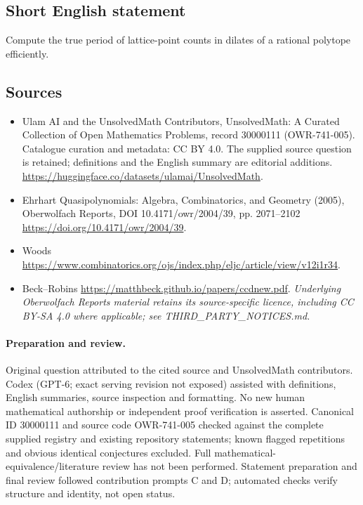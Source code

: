 \documentclass[11pt]{article}
\begin{document}
\subsection{Short English statement}
Compute the true period of lattice-point counts in dilates of a rational polytope efficiently.
\subsection{Sources}
\begin{itemize}
\item[\hypertarget{source:30000111:1}{S1}] Ulam AI and the UnsolvedMath Contributors, UnsolvedMath: A Curated Collection of Open Mathematics Problems, record 30000111 (OWR-741-005). Catalogue curation and metadata: CC BY 4.0. The supplied source question is retained; definitions and the English summary are editorial additions.
\url{https://huggingface.co/datasets/ulamai/UnsolvedMath}.
\item[\hypertarget{source:30000111:2}{S2}] Ehrhart Quasipolynomials: Algebra, Combinatorics, and Geometry (2005), Oberwolfach Reports, DOI 10.4171/owr/2004/39, pp. 2071--2102
\url{https://doi.org/10.4171/owr/2004/39}.
\item[\hypertarget{source:30000111:3}{S3}] Woods
\url{https://www.combinatorics.org/ojs/index.php/eljc/article/view/v12i1r34}.
\item[\hypertarget{source:30000111:4}{S4}] Beck--Robins
\url{https://matthbeck.github.io/papers/ccdnew.pdf}.
\textit{Underlying Oberwolfach Reports material retains its source-specific licence, including CC BY-SA 4.0 where applicable; see THIRD\_PARTY\_NOTICES.md.}
\end{itemize}
\paragraph{Preparation and review.}
Original question attributed to the cited source and UnsolvedMath contributors. Codex (GPT-6; exact serving revision not exposed) assisted with definitions, English summaries, source inspection and formatting. No new human mathematical authorship or independent proof verification is asserted. Canonical ID 30000111 and source code OWR-741-005 checked against the complete supplied registry and existing repository statements; known flagged repetitions and obvious identical conjectures excluded. Full mathematical-equivalence/literature review has not been performed. Statement preparation and final review followed contribution prompts C and D; automated checks verify structure and identity, not open status.
\label{end:30000111}
\end{document}
